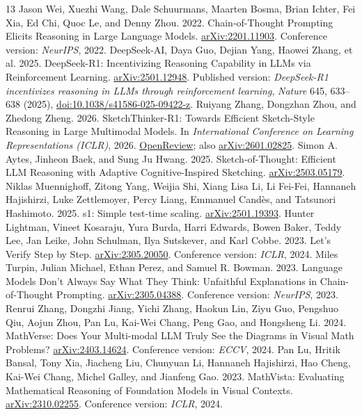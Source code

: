 \documentclass[11pt,letterpaper]{article}
\newcommand{\arxiv}[1]{\href{https://arxiv.org/abs/#1}{arXiv:#1}}
\begin{document}
\clearpage
\begin{thebibliography}{13}
\small
{} Jason Wei, Xuezhi Wang, Dale Schuurmans, Maarten Bosma, Brian Ichter, Fei Xia, Ed Chi, Quoc Le, and Denny Zhou. 2022. Chain-of-Thought Prompting Elicits Reasoning in Large Language Models. \arxiv{2201.11903}. Conference version: \emph{NeurIPS}, 2022.
 DeepSeek-AI, Daya Guo, Dejian Yang, Haowei Zhang, et al. 2025. DeepSeek-R1: Incentivizing Reasoning Capability in LLMs via Reinforcement Learning. \arxiv{2501.12948}. Published version: \emph{DeepSeek-R1 incentivizes reasoning in LLMs through reinforcement learning}, \emph{Nature} 645, 633--638 (2025), \href{https://doi.org/10.1038/s41586-025-09422-z}{doi:10.1038/s41586-025-09422-z}.
 Ruiyang Zhang, Dongzhan Zhou, and Zhedong Zheng. 2026. SketchThinker-R1: Towards Efficient Sketch-Style Reasoning in Large Multimodal Models. In \emph{International Conference on Learning Representations (ICLR)}, 2026. \href{https://openreview.net/forum?id=ZSMDuKtYbt}{OpenReview}; also \arxiv{2601.02825}.
 Simon A. Aytes, Jinheon Baek, and Sung Ju Hwang. 2025. Sketch-of-Thought: Efficient LLM Reasoning with Adaptive Cognitive-Inspired Sketching. \arxiv{2503.05179}.
 Niklas Muennighoff, Zitong Yang, Weijia Shi, Xiang Lisa Li, Li Fei-Fei, Hannaneh Hajishirzi, Luke Zettlemoyer, Percy Liang, Emmanuel Cand\`es, and Tatsunori Hashimoto. 2025. s1: Simple test-time scaling. \arxiv{2501.19393}.
 Hunter Lightman, Vineet Kosaraju, Yura Burda, Harri Edwards, Bowen Baker, Teddy Lee, Jan Leike, John Schulman, Ilya Sutskever, and Karl Cobbe. 2023. Let's Verify Step by Step. \arxiv{2305.20050}. Conference version: \emph{ICLR}, 2024.
 Miles Turpin, Julian Michael, Ethan Perez, and Samuel R. Bowman. 2023. Language Models Don't Always Say What They Think: Unfaithful Explanations in Chain-of-Thought Prompting. \arxiv{2305.04388}. Conference version: \emph{NeurIPS}, 2023.
 Renrui Zhang, Dongzhi Jiang, Yichi Zhang, Haokun Lin, Ziyu Guo, Pengshuo Qiu, Aojun Zhou, Pan Lu, Kai-Wei Chang, Peng Gao, and Hongsheng Li. 2024. MathVerse: Does Your Multi-modal LLM Truly See the Diagrams in Visual Math Problems? \arxiv{2403.14624}. Conference version: \emph{ECCV}, 2024.
 Pan Lu, Hritik Bansal, Tony Xia, Jiacheng Liu, Chunyuan Li, Hannaneh Hajishirzi, Hao Cheng, Kai-Wei Chang, Michel Galley, and Jianfeng Gao. 2023. MathVista: Evaluating Mathematical Reasoning of Foundation Models in Visual Contexts. \arxiv{2310.02255}. Conference version: \emph{ICLR}, 2024.

\end{thebibliography}
\end{document}
